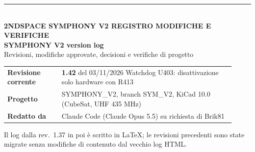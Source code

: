 \documentclass[10pt,a4paper]{article}
\begin{document}
\begin{titlepage}
\raggedright
{\color{accent}\rule{\linewidth}{4pt}}\\[8mm]
{\color{accent}\bfseries\small 2NDSPACE \textperiodcentered{} SYMPHONY V2 \textperiodcentered{} REGISTRO MODIFICHE E VERIFICHE}\\[4mm]
{\fontsize{26}{30}\selectfont\bfseries SYMPHONY V2 \textendash{} version log}\\[3mm]
{\large\color{tagnote} Revisioni, modifiche approvate, decisioni e verifiche di progetto}\\[10mm]
\begin{tabular}{@{}p{0.22\linewidth}p{0.7\linewidth}@{}}
\textbf{Revisione corrente} & \textbf{1.42} del 03/11/2026 \textendash{} Watchdog U403: disattivazione solo hardware con R413\\[3pt]
\textbf{Progetto} & SYMPHONY\_V2, branch SYM\_V2, KiCad 10.0 (CubeSat, UHF 435 MHz)\\[3pt]
\textbf{Redatto da} & Claude Code (Claude Opus 5.5) su richiesta di Brik81\\
\end{tabular}
\vfill
{\small Il log dalla rev.\ 1.37 in poi \`e scritto in \LaTeX; le revisioni precedenti sono state migrate senza modifiche di contenuto dal vecchio log HTML.}
\end{titlepage}

\tableofcontents
\clearpage










































\end{document}
